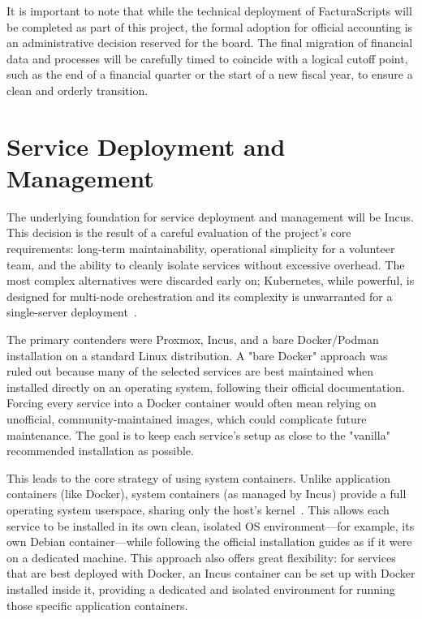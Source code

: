 It is important to note that while the technical deployment of FacturaScripts will be completed as part of this project, the formal adoption for official accounting is an administrative decision reserved for the board. The final migration of financial data and processes will be carefully timed to coincide with a logical cutoff point, such as the end of a financial quarter or the start of a new fiscal year, to ensure a clean and orderly transition.

\section{Service Deployment and Management}

The underlying foundation for service deployment and management will be Incus. This decision is the result of a careful evaluation of the project's core requirements: long-term maintainability, operational simplicity for a volunteer team, and the ability to cleanly isolate services without excessive overhead. The most complex alternatives were discarded early on; Kubernetes, while powerful, is designed for multi-node orchestration and its complexity is unwarranted for a single-server deployment~\cite{kubernetes-docs-2025}.

The primary contenders were Proxmox, Incus, and a bare Docker/Podman installation on a standard Linux distribution. A "bare Docker" approach was ruled out because many of the selected services are best maintained when installed directly on an operating system, following their official documentation. Forcing every service into a Docker container would often mean relying on unofficial, community-maintained images, which could complicate future maintenance. The goal is to keep each service's setup as close to the "vanilla" recommended installation as possible.

This leads to the core strategy of using system containers. Unlike application containers (like Docker), system containers (as managed by Incus) provide a full operating system userspace, sharing only the host's kernel~\cite{incus-linux-containers-2023}. This allows each service to be installed in its own clean, isolated OS environment—for example, its own Debian container—while following the official installation guides as if it were on a dedicated machine. This approach also offers great flexibility: for services that are best deployed with Docker, an Incus container can be set up with Docker installed inside it, providing a dedicated and isolated environment for running those specific application containers.

